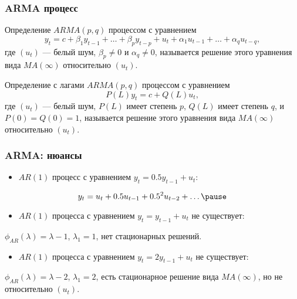 \begin{frame}
  \frametitle{ARMA процесс}

  \begin{block}{Определение}
    $ARMA(p, q)$ процессом с уравнением 
    \[
      y_t = c + \beta_1 y_{t-1} + \ldots + \beta_p y_{t-p} + u_t + \alpha_1 u_{t-1} + \ldots + \alpha_q u_{t-q}, 
    \]
    где $(u_t)$ — белый шум, $\beta_p \neq 0$ и $\alpha_q \neq 0$, называется 
    решение этого уравнения вида $MA(\infty)$ относительно $(u_t)$.
  \end{block}

  \pause  
  \begin{block}{Определение с лагами}
    $ARMA(p,q)$ процессом с уравнением 
    \[
      P(L)y_t = c + Q(L)u_t, 
    \]
    где $(u_t)$ — белый шум, $P(L)$ имеет степень $p$, $Q(L)$ имеет степень $q$, и $P(0)=Q(0)=1$, называется 
    решение этого уравнения вида $MA(\infty)$ относительно $(u_t)$.  
  \end{block}
\end{frame}


\begin{frame}
  \frametitle{ARMA: нюансы}

  \pause
  \begin{itemize}
    \item $AR(1)$ процесс с уравнением $y_t = 0.5 y_{t-1} + u_t$:
  \end{itemize}
  \pause
  \[
  y_t = u_t + 0.5 u_{t-1} + 0.5^2 u_{t-2} + \ldots   \pause
  \]
  \begin{itemize}
    \item $AR(1)$ процесса с уравнением $y_t = y_{t-1} + u_t$ не существует:
  \end{itemize}
  \pause
  $\phi_{AR}(\lambda) = \lambda - 1$, $\lambda_1 = 1$, нет стационарных решений. 

  \pause
  \begin{itemize}
    \item $AR(1)$ процесса с уравнением $y_t = 2 y_{t-1} + u_t$ не существует:
  \end{itemize}
  \pause
  $\phi_{AR}(\lambda) = \lambda - 2$, $\lambda_1 = 2$, есть стационарное решение 
  вида $MA(\infty)$, но не относительно $(u_t)$.
  
\end{frame}

